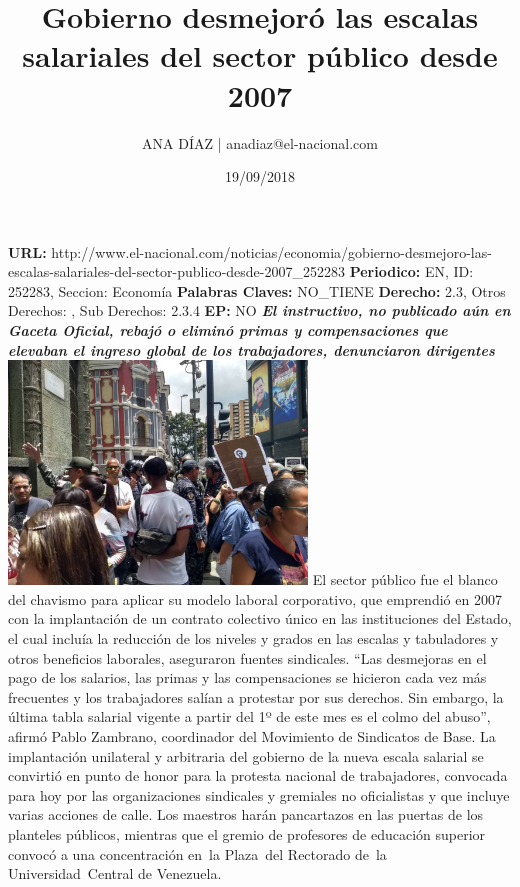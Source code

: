 \documentclass{article}%
\title{\textbf{Gobierno desmejoró las escalas salariales del sector público desde 2007}}%
\author{ANA DÍAZ | anadiaz@el{-}nacional.com}%
\date{19/09/2018}%
\begin{document}
%
\normalsize%
\maketitle%
\textbf{URL: }%
http://www.el{-}nacional.com/noticias/economia/gobierno{-}desmejoro{-}las{-}escalas{-}salariales{-}del{-}sector{-}publico{-}desde{-}2007\_252283\newline%
%
\textbf{Periodico: }%
EN, %
ID: %
252283, %
Seccion: %
Economía\newline%
%
\textbf{Palabras Claves: }%
NO\_TIENE\newline%
%
\textbf{Derecho: }%
2.3, %
Otros Derechos: %
, %
Sub Derechos: %
2.3.4\newline%
%
\textbf{EP: }%
NO\newline%
\newline%
%
\textbf{\textit{El instructivo, no publicado aún en Gaceta Oficial, rebajó o eliminó primas y compensaciones que elevaban el ingreso global de los trabajadores, denunciaron dirigentes}}%
\newline%
\newline%
%
\includegraphics[width=300px]{124.jpg}%
\newline%
%
El sector público fue el blanco del chavismo para aplicar su modelo laboral corporativo, que emprendió en 2007 con la implantación de un contrato colectivo único en las instituciones del Estado, el cual incluía la reducción de los niveles y grados en las escalas y tabuladores y otros beneficios laborales, aseguraron fuentes sindicales.%
\newline%
%
“Las desmejoras en el pago de los salarios, las primas y las compensaciones se hicieron cada vez más frecuentes y los trabajadores salían a protestar por sus derechos. Sin embargo, la última tabla salarial vigente a partir del 1º de este mes es el colmo del abuso”, afirmó Pablo Zambrano, coordinador del Movimiento de Sindicatos de Base.%
\newline%
%
La implantación unilateral y arbitraria del gobierno de la nueva escala salarial se convirtió en punto de honor para la protesta nacional de trabajadores, convocada para hoy por las organizaciones sindicales y gremiales no oficialistas y que incluye varias acciones de calle. Los maestros harán pancartazos en las puertas de los planteles públicos, mientras que el gremio de profesores de educación superior convocó a una concentración en~la Plaza~del Rectorado de~la Universidad~Central de Venezuela.%
\end{document}
